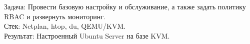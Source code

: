 \item {}
    Задача: Провести базовую настройку и обслуживание, а также задать политику RBAC и развернуть мониторинг.\\
    Стек: Netplan, htop, du, QEMU/KVM.\\
    Результат: Настроенный Ubuntu Server на базе KVM.
